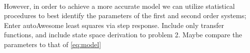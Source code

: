\paragraph{}
However, in order to achieve a more accurate model we can utilize statistical procedures to best identify the parameters of the first and second order systems; Enter autoAwesome least squares via step response. Include only transfer functions, and include state space derivation to problem 2. Maybe compare the parameters to that of \eqref{eq:model}


